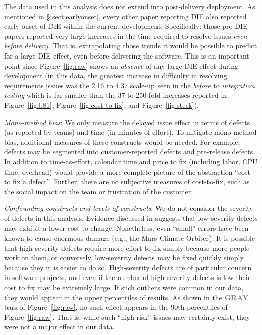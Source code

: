 \documentclass[smallcondensed]{svjour3}
\newcommand{\tion}[1]{\S\ref{sect:#1}}
\newcommand{\fig}[1]{Figure~\ref{fig:#1}}
\begin{document}
The data used in this analysis does not extend into post-delivery deployment. As mentioned in \tion{earlyonset}, every other
paper reporting DIE also reported  early onset of DIE
within the current development. Specifically: those pro-DIE papers reported very large
increases in the time required to resolve issues {\em even before delivery}. That is, extrapolating those
trends it would be possible to predict for a large DIE effect, even before delivering the software.
This is an important point since  Figure~\ref{fig:raw} shows an {\em absence}
of any  large DIE effect during development
(in this data, the greatest increase in difficulty in resolving requirements issues was the 2.16 to 4.37
scale-up seen in the {\em before} to {\em integration testing} 
which is far smaller than the 37 to 250-fold increases reported in \fig{b81}, \fig{cost-to-fix},
and \fig{steck}).  


\textit{Mono-method bias}: We only measure the delayed issue effect in terms of defects (as reported by teams) and time (in minutes of effort). To mitigate mono-method bias, additional measures of these constructs would be needed. For example, defects may be segmented into customer-reported defects and pre-release defects. In addition to time-as-effort, calendar time and price to fix (including labor, CPU time, overhead) would provide a more complete picture of the abstraction ``cost to fix a defect''. Further, there are no subjective measures of cost-to-fix, such as the social impact on the team or frustration of the customer.

\textit{Confounding constructs and levels of constructs}: We do not consider the severity of defects in this analysis. Evidence discussed in \cite{Shull02} suggests that low severity defects may exhibit a lower cost to change. Nonetheless, even ``small'' errors have been known to cause enormous damage (e.g., the Mars Climate Orbiter). It is possible that high-severity defects require more effort to fix simply because more people work on them, or conversely, low-severity defects may be fixed quickly simply because they it is easier to do so. High-severity defects are of particular concern in software projects, and even if the number of high-severity defects is low their cost to fix may be extremely large. If such outliers were common in our data, they would appear in the upper percentiles of results. As shown in the \textcolor{gray}{{\bf GRAY}} bars of \fig{raw}, no such effect appears in the 90th percentiles of \fig{raw}.  That is, while such ``high risk'' issues may certainly exist, they were not a major effect in our data.
\end{document}

